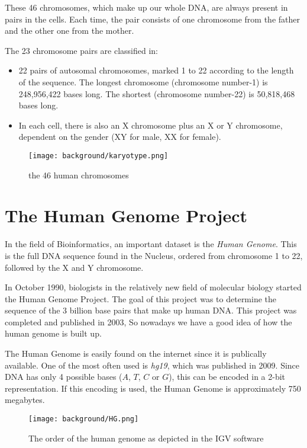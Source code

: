 These 46 chromosomes, which make up our whole DNA, are always present in pairs in the cells. Each time, the pair consists of one chromosome from the father and the other one from the mother. 

The 23 chromosome pairs are classified in:
\begin{itemize}
	\item 22 pairs of autosomal chromosomes, marked 1 to 22 according to the length of the sequence. The longest chromosome (chromosome number-1) is 248,956,422 bases long. The shortest (chromosome number-22) is 50,818,468 bases long.
	\item In each cell, there is also an X chromosome plus an X or Y chromosome, dependent on the gender (XY for male, XX for female).
\end{itemize}


\begin{figure}[H]
	\centering
	\texttt{[image: background/karyotype.png]}
	\caption{the 46 human chromosomes}
	\label{fig:karyotype}
\end{figure}


\section{The Human Genome Project}

In the field of Bioinformatics, an important dataset is the \emph{Human Genome}. This is the full DNA sequence found in the Nucleus, ordered from chromosome 1 to 22, followed by the X and Y chromosome.

In October 1990, biologists in the relatively new field of molecular biology started the Human Genome Project. The goal of this project was to determine the sequence of the 3 billion base pairs that make up human DNA. This project was completed and published in 2003, So nowadays we have a good idea of how the human genome is built up.

The Human Genome is easily found on the internet since it is publically available. One of the most often used is \emph{hg19}, which was published in 2009. Since DNA has only 4 possible bases ($A$, $T$, $C$ or $G$), this can be encoded in a 2-bit representation. If this encoding is used, the Human Genome is approximately 750 megabytes.

\begin{figure}[H]
	\centering
	\texttt{[image: background/HG.png]}
	\caption{The order of the human genome as depicted in the IGV software}
	\label{fig:HG}
\end{figure}

